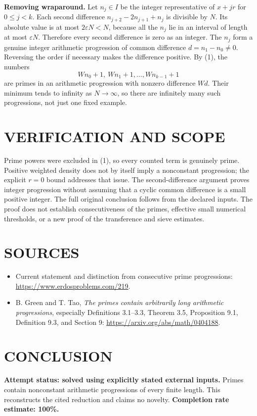 \textbf{Removing wraparound.} Let $n_j\in I$ be the integer representative of $x+jr$ for $0\leq j<k$. Each second difference $n_{j+2}-2n_{j+1}+n_j$ is divisible by $N$. Its absolute value is at most $2\varepsilon N<N$, because all the $n_j$ lie in an interval of length at most $\varepsilon N$. Therefore every second difference is zero as an integer. The $n_j$ form a genuine integer arithmetic progression of common difference $d=n_1-n_0\ne0$. Reversing the order if necessary makes the difference positive. By (1), the numbers
\[
Wn_0+1,\ Wn_1+1,\ldots, Wn_{k-1}+1
\]
are primes in an arithmetic progression with nonzero difference $Wd$. Their minimum tends to infinity as $N\to\infty$, so there are infinitely many such progressions, not just one fixed example.

\section{VERIFICATION AND SCOPE}
Prime powers were excluded in (1), so every counted term is genuinely prime. Positive weighted density does not by itself imply a nonconstant progression; the explicit $r=0$ bound addresses that issue. The second-difference argument proves integer progression without assuming that a cyclic common difference is a small positive integer. The full original conclusion follows from the declared inputs. The proof does not establish consecutiveness of the primes, effective small numerical thresholds, or a new proof of the transference and sieve estimates.

\section{SOURCES}
\begin{itemize}
\item Current statement and distinction from consecutive prime progressions: \url{https://www.erdosproblems.com/219}.
\item B. Green and T. Tao, \emph{The primes contain arbitrarily long arithmetic progressions}, especially Definitions 3.1--3.3, Theorem 3.5, Proposition 9.1, Definition 9.3, and Section 9: \url{https://arxiv.org/abs/math/0404188}.
\end{itemize}
\section{CONCLUSION}
\textbf{Attempt status: solved using explicitly stated external inputs.} Primes contain nonconstant arithmetic progressions of every finite length. This reconstructs the cited reduction and claims no novelty.
\textbf{Completion rate estimate: 100\%.}
